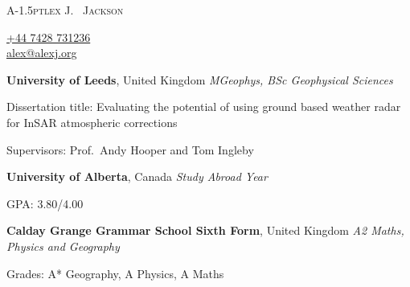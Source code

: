 \documentclass[11pt]{article}
\makeatletter
\def\myemail{alex@alexj.org}
\def\myweb{alexjohnj}
\def\myphone{+44 7428 731236}
\makeatother
\begin{document}
\flushbottom
\pagestyle{fancy} \setlength\headwidth{6.5in}
\thispagestyle{empty}
\begin{adjustwidth}{-1in}{}
  {\Huge
    {\sffamily\textsc{%
        {A}\kern-1.5ptlex
        {J}\kern-2pt.~%
        {J}ackson}
    }
  }
  \hfill\hfill\hfill
  {
    \begin{minipage}[b]{2in}
      \flushleft \footnotesize
    \end{minipage}
    \hfill
    \begin{minipage}[b]{1.2in}
      \flushright \footnotesize
      \href{tel:\myphone}{\myphone} \\
      \href{mailto:\myemail}{\myemail} \\
    \end{minipage}
  }\par
  \hrulefill
\end{adjustwidth}
\reversemarginpar
\setlength\marginparwidth{0.85in}
\smallskip
{}%
\textbf{University of Leeds}, United Kingdom \newline
\emph{MGeophys, BSc Geophysical Sciences} 
\begin{itemize*}
\item Dissertation title: Evaluating the potential of using ground based weather
  radar for InSAR atmospheric corrections
\item Supervisors: Prof.~Andy Hooper and Tom Ingleby
\end{itemize*}

\medskip
\textbf{University of Alberta}, Canada \newline
\emph{Study Abroad Year} 
\begin{itemize*}
\item GPA\@: 3.80/4.00
\end{itemize*}

\medskip
\textbf{Calday Grange Grammar School Sixth Form}, United Kingdom \newline
\emph{A2 Maths, Physics and Geography} 
\begin{itemize*}
\item Grades: A* Geography, A Physics, A Maths
\end{itemize*}
\end{document}
